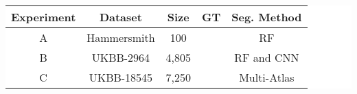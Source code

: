 \begin{table}[h!]
  \centering
  \colorbox{white}{
      \begin{tabular}{ccccc}
      \hline 
      \textbf{Experiment}  		& \textbf{Dataset} 				& \textbf{Size} 		& \textbf{GT} 		& \textbf{Seg. Method} 	\\	\hline		
      A 		& Hammersmith   & 100		& \cmark		& RF 			\\
      B 		& UKBB-2964	    & 4,805		& \cmark		& RF and CNN  	\\
      C 		& UKBB-18545	& 7,250		& \xmark		& Multi-Atlas	\\   \hline
      \end{tabular}
  }%
\end{table}
